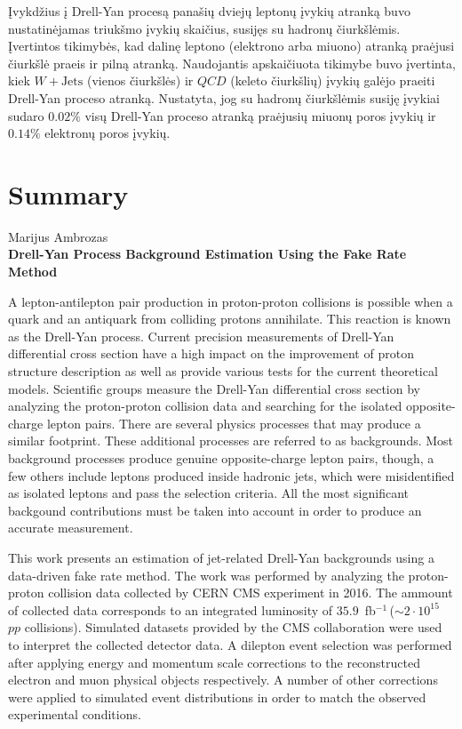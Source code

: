 \documentclass[a4paper, 12pt, oneside]{article}
\newcommand{\WJets}{W\! +\!\mathrm{Jets}}
\newcommand{\invfb}{fb$^{-1}\,$}
\newcommand{\QCD}{QC\! D}
\newlength\q
\begin{document}
Įvykdžius į Drell-Yan procesą panašių dviejų leptonų įvykių atranką buvo nustatinėjamas triukšmo įvykių skaičius, susijęs
su hadronų čiurkšlėmis.
Įvertintos tikimybės, kad dalinę leptono (elektrono arba miuono) atranką praėjusi čiurkšlė praeis ir pilną atranką.
Naudojantis apskaičiuota tikimybe buvo įvertinta, kiek $\WJets$ (vienos čiurkšlės) ir $\QCD$ (keleto čiurkšlių)
įvykių galėjo praeiti Drell-Yan proceso atranką.
Nustatyta, jog su hadronų čiurkšlėmis susiję įvykiai sudaro $0.02\%$ visų Drell-Yan proceso atranką praėjusių miuonų poros
įvykių ir $0.14\%$ elektronų poros įvykių.


\newpage
\section*{Summary}
\begin{centering}
Marijus Ambrozas\\
\textbf{Drell-Yan Process Background Estimation Using the Fake Rate Method}\\
\end{centering}
\vspace{0.5cm}

A lepton-antilepton pair production in proton-proton collisions is possible when a quark and an antiquark from colliding
protons annihilate.
This reaction is known as the Drell-Yan process.
Current precision measurements of Drell-Yan differential cross section have a high impact on the improvement
of proton structure description as well as provide various tests for the current theoretical models.
Scientific groups measure the Drell-Yan differential cross section by analyzing the proton-proton collision data and
searching for the isolated opposite-charge lepton pairs.
There are several physics processes that may produce a similar footprint.
These additional processes are referred to as backgrounds.
Most background processes produce genuine opposite-charge lepton pairs, though, a few others include leptons produced inside
hadronic jets, which were misidentified as isolated leptons and pass the selection criteria.
All the most significant backgound contributions must be taken into account in order to produce an accurate measurement.


This work presents an estimation of jet-related Drell-Yan backgrounds using a data-driven fake rate method.
The work was performed by analyzing the proton-proton collision data collected by CERN CMS experiment in 2016.
The ammount of collected data corresponds to an integrated luminosity of $35.9$~\invfb ($\sim\!2 \cdot 10^{15}$ $pp$ collisions).
Simulated datasets provided by the CMS collaboration were used to interpret the collected detector data.
A dilepton event selection was performed after applying energy and momentum scale corrections to the reconstructed electron and muon
physical objects respectively.
A number of other corrections were applied to simulated event distributions in order to match the observed experimental conditions.
\end{document}
